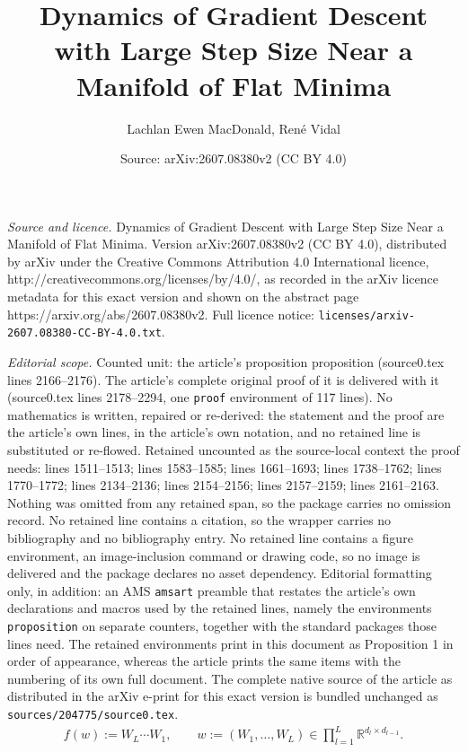 \documentclass[10pt,a4paper]{amsart}
\title{Dynamics of Gradient Descent with Large Step Size Near a Manifold of Flat Minima}
\author{Lachlan Ewen MacDonald, Ren\'e Vidal}
\date{Source: arXiv:2607.08380v2 (CC BY 4.0)}
\newcommand{\RB}{\mathbb{R}}
\begin{document}
\maketitle

\noindent\emph{Source and licence.} Dynamics of Gradient Descent with Large Step Size Near a Manifold of Flat Minima. Version arXiv:2607.08380v2 (CC BY 4.0), distributed by arXiv under the Creative Commons Attribution 4.0 International licence, http://creativecommons.org/licenses/by/4.0/, as recorded in the arXiv licence metadata for this exact version and shown on the abstract page https://arxiv.org/abs/2607.08380v2. Full licence notice: \texttt{licenses/arxiv-2607.08380-CC-BY-4.0.txt}.\par\smallskip

\noindent\textit{Editorial scope.} Counted unit: the article's proposition proposition (source0.tex lines 2166--2176). The article's complete original proof of it is delivered with it (source0.tex lines 2178--2294, one \texttt{proof} environment of 117 lines). No mathematics is written, repaired or re-derived: the statement and the proof are the article's own lines, in the article's own notation, and no retained line is substituted or re-flowed.  Retained uncounted as the source-local context the proof needs: lines 1511--1513; lines 1583--1585; lines 1661--1693; lines 1738--1762; lines 1770--1772; lines 2134--2136; lines 2154--2156; lines 2157--2159; lines 2161--2163.  Nothing was omitted from any retained span, so the package carries no omission record.  No retained line contains a citation, so the wrapper carries no bibliography and no bibliography entry.  No retained line contains a figure environment, an image-inclusion command or drawing code, so no image is delivered and the package declares no asset dependency.  Editorial formatting only, in addition: an AMS \texttt{amsart} preamble that restates the article's own declarations and macros used by the retained lines, namely the environments \texttt{proposition} on separate counters, together with the standard packages those lines need.  The retained environments print in this document as Proposition 1 in order of appearance, whereas the article prints the same items with the numbering of its own full document.  The complete native source of the article as distributed in the arXiv e-print for this exact version is bundled unchanged as \texttt{sources/204775/source0.tex}.
\begin{align}\label{eq:matrixfactorisationf}
f(w):=W_L\cdots W_1,\qquad w:=(W_1,\dots,W_L)\in \prod_{l=1}^{L}\RB^{d_l\times d_{l-1}}.
\end{align}
\end{document}
